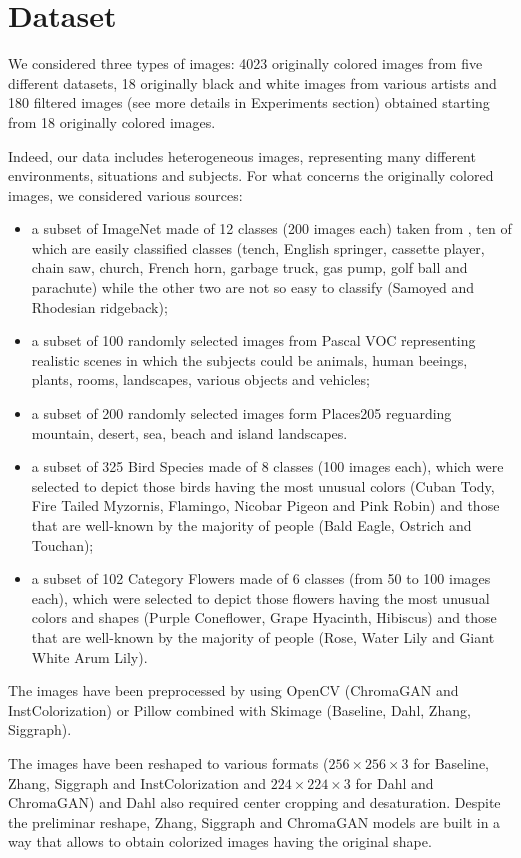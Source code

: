 \section{Dataset}
We considered three types of images: 4023 originally colored images from five different datasets, 18 originally black and white images from various artists and 180 filtered images (see more details in Experiments section) obtained starting from 18 originally colored images.

Indeed, our data includes heterogeneous images, representing many different environments, situations and subjects.
For what concerns the originally colored images, we considered various sources:
\begin{itemize}
	\item a subset of ImageNet made of 12 classes (200 images each) taken from \cite{imagenette}, ten of which are easily classified classes (tench, English springer, cassette player, chain saw, church, French horn, garbage truck, gas pump, golf ball and parachute) while the other two are not so easy to classify (Samoyed and Rhodesian ridgeback);
	\item a subset of 100 randomly selected images from Pascal VOC \cite{pascal} representing realistic scenes in which the subjects could be animals, human beeings, plants, rooms, landscapes, various objects and vehicles;
	\item a subset of 200 randomly selected images form Places205 \cite{place} reguarding mountain, desert, sea, beach and island landscapes.
	\item a subset of 325 Bird Species \cite{bird} made of 8 classes (100 images each), which were selected to depict those birds having the most unusual colors (Cuban Tody, Fire Tailed Myzornis, Flamingo, Nicobar Pigeon and Pink Robin) and those that are well-known by the majority of people (Bald Eagle, Ostrich and Touchan);
	\item a subset of 102 Category Flowers \cite{flower} made of 6 classes (from 50 to 100 images each), which were selected to depict those flowers having the most unusual colors and shapes (Purple Coneflower, Grape Hyacinth, Hibiscus) and those that are well-known by the majority of people (Rose, Water Lily and Giant White Arum Lily).
\end{itemize}

The images have been preprocessed by using OpenCV (ChromaGAN and InstColorization) or Pillow combined with Skimage
(Baseline, Dahl, Zhang, Siggraph).

The images have been reshaped to various formats ($256\times256\times3$ for Baseline, Zhang, Siggraph and InstColorization and $224\times224\times3$ for Dahl and ChromaGAN) and Dahl also required center cropping and desaturation. Despite the preliminar reshape, Zhang, Siggraph and ChromaGAN models are built in a way that allows to obtain colorized images having the original shape.

